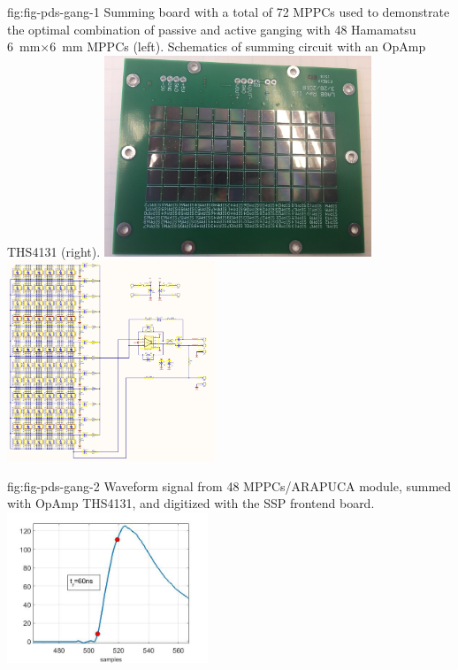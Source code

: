 \begin{dunefigure}
 {fig:fig-pds-gang-1}
 {Summing board with a total of 72 MPPCs used to demonstrate the optimal combination of passive and active ganging with 48 Hamamatsu \SI{6}{mm}$\times$\SI{6}{mm} MPPCs (left).  Schematics of summing circuit with an OpAmp THS4131 (right).}
\includegraphics[height=6cm]{graphics/pds_gang_fig1.jpg}
\includegraphics[height=6cm]{graphics/pds_gang_fig2.png}
\end{dunefigure}

\begin{dunefigure}
 {fig:fig-pds-gang-2}
 {Waveform signal from 48 MPPCs/ARAPUCA module, summed with OpAmp THS4131, and digitized with the SSP frontend board.}
\includegraphics[height=4.5cm]{graphics/pds-gang-rise_time.jpg}
\end{dunefigure}

